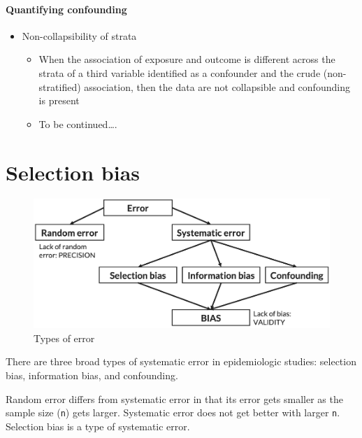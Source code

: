 \documentclass[
]{book}
\providecommand{\tightlist}{%
  \setlength{\itemsep}{0pt}\setlength{\parskip}{0pt}}
\begin{document}
\hypertarget{quantifying-confounding}{%
\subsubsection{Quantifying confounding}\label{quantifying-confounding}}

\begin{itemize}
\tightlist
\item
  Non-collapsibility of strata

  \begin{itemize}
  \tightlist
  \item
    When the association of exposure and outcome is different across the strata of a third variable identified as a confounder and the crude (non-stratified) association, then the data are not collapsible and confounding is present
  \item
    To be continued\ldots.
  \end{itemize}
\end{itemize}

\hypertarget{selection-bias}{%
\chapter{Selection bias}\label{selection-bias}}

\begin{figure}

{\centering \includegraphics[width=1\linewidth]{img/selection-bias/types_of_error} 

}

\caption{Types of error}\label{fig:unnamed-chunk-19}
\end{figure}

There are three broad types of systematic error in epidemiologic studies: selection bias, information bias, and confounding.

Random error differs from systematic error in that its error gets smaller as the sample size (\texttt{n}) gets larger. Systematic error does not get better with larger \texttt{n}. Selection bias is a type of systematic error.
\end{document}
